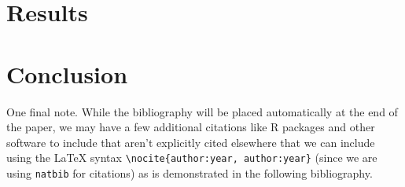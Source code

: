 \documentclass[12pt,titlepage]{mktg-article}
\begin{document}
\hypertarget{results}{%
\section{Results}\label{results}}

\hypertarget{conclusion}{%
\section{Conclusion}\label{conclusion}}

One final note. While the bibliography will be placed automatically at the end of the paper, we may have a few additional citations like R packages and other software to include that aren't explicitly cited elsewhere that we can include using the LaTeX syntax \texttt{\textbackslash{}nocite\{author:year,\ author:year\}} (since we are using \texttt{natbib} for citations) as is demonstrated in the following bibliography.

\nocite{bayesm:2018, loo:2018}

\pagebreak


\end{document}
